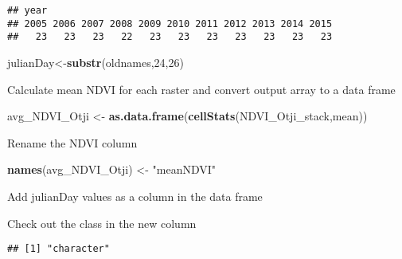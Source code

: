 \documentclass[]{article}
\newenvironment{Shaded}{\begin{snugshade}}{\end{snugshade}}
\newcommand{\KeywordTok}[1]{\textcolor[rgb]{0.13,0.29,0.53}{\textbf{{#1}}}}
\newcommand{\DecValTok}[1]{\textcolor[rgb]{0.00,0.00,0.81}{{#1}}}
\newcommand{\StringTok}[1]{\textcolor[rgb]{0.31,0.60,0.02}{{#1}}}
\newcommand{\NormalTok}[1]{{#1}}
\begin{document}
\begin{verbatim}
## year
## 2005 2006 2007 2008 2009 2010 2011 2012 2013 2014 2015 
##   23   23   23   22   23   23   23   23   23   23   23
\end{verbatim}

\begin{Shaded}
\begin{Highlighting}[]
\NormalTok{julianDay<-}\KeywordTok{substr}\NormalTok{(oldnames,}\DecValTok{24}\NormalTok{,}\DecValTok{26}\NormalTok{)}
\end{Highlighting}
\end{Shaded}

Calculate mean NDVI for each raster and convert output array to a data
frame

\begin{Shaded}
\begin{Highlighting}[]
\NormalTok{avg_NDVI_Otji <-}\StringTok{ }\KeywordTok{as.data.frame}\NormalTok{(}\KeywordTok{cellStats}\NormalTok{(NDVI_Otji_stack,mean))}
\end{Highlighting}
\end{Shaded}

Rename the NDVI column

\begin{Shaded}
\begin{Highlighting}[]
\KeywordTok{names}\NormalTok{(avg_NDVI_Otji) <-}\StringTok{ "meanNDVI"}
\end{Highlighting}
\end{Shaded}

Add julianDay values as a column in the data frame

\begin{Shaded}
\end{Shaded}

Check out the class in the new column

\begin{Shaded}
\end{Shaded}

\begin{verbatim}
## [1] "character"
\end{verbatim}
\end{document}
